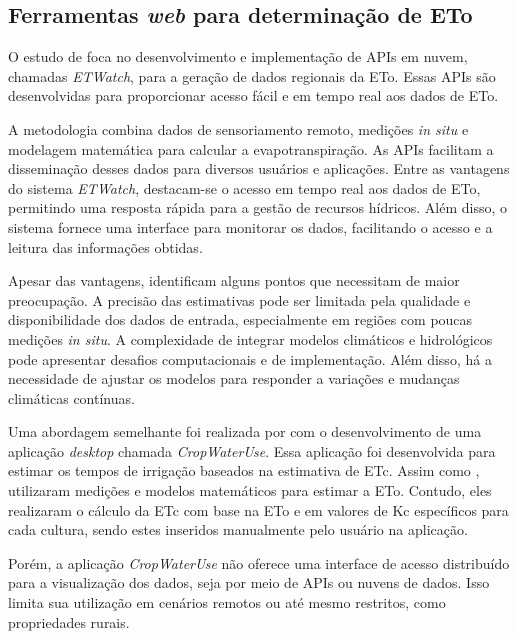 \subsection{Ferramentas \textit{web} para determinação de ETo}

O estudo de \textcite{Fangming_webeva2021} foca no desenvolvimento e implementação de APIs em nuvem, chamadas \textit{ETWatch}, para a geração de dados regionais da ETo. Essas APIs são desenvolvidas para proporcionar acesso fácil e em tempo real aos dados de ETo.

A metodologia combina dados de sensoriamento remoto, medições \textit{in situ} e modelagem matemática para calcular a evapotranspiração. As APIs facilitam a disseminação desses dados para diversos usuários e aplicações. Entre as vantagens do sistema \textit{ETWatch}, destacam-se o acesso em tempo real aos dados de ETo, permitindo uma resposta rápida para a gestão de recursos hídricos. Além disso, o sistema fornece uma interface para monitorar os dados, facilitando o acesso e a leitura das informações obtidas.

Apesar das vantagens, \textcite{Fangming_webeva2021} identificam alguns pontos que necessitam de maior preocupação. A precisão das estimativas pode ser limitada pela qualidade e disponibilidade dos dados de entrada, especialmente em regiões com poucas medições \textit{in situ}. A complexidade de integrar modelos climáticos e hidrológicos pode apresentar desafios computacionais e de implementação. Além disso, há a necessidade de ajustar os modelos para responder a variações e mudanças climáticas contínuas.

Uma abordagem semelhante foi realizada por \textcite{Jose_webeva2011} com o desenvolvimento de uma aplicação \textit{desktop} chamada \textit{CropWaterUse}. Essa aplicação foi desenvolvida para estimar os tempos de irrigação baseados na estimativa de ETc. Assim como \textcite{Fangming_webeva2021}, \textcite{Jose_webeva2011} utilizaram medições e modelos matemáticos para estimar a ETo. Contudo, eles realizaram o cálculo da ETc com base na ETo e em valores de Kc específicos para cada cultura, sendo estes inseridos manualmente pelo usuário na aplicação.

Porém, a aplicação \textit{CropWaterUse} não oferece uma interface de acesso distribuído para a visualização dos dados, seja por meio de APIs ou nuvens de dados. Isso limita sua utilização em cenários remotos ou até mesmo restritos, como propriedades rurais.

